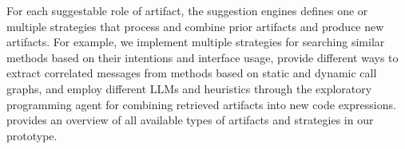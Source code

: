 For each suggestable role of artifact, the suggestion engines defines one or multiple strategies that process and combine prior artifacts and produce new artifacts.
For example, we implement multiple strategies for searching similar methods based on their intentions and interface usage, provide different ways to extract correlated messages from methods based on static and dynamic call graphs, and employ different LLMs and heuristics through the exploratory programming agent for combining retrieved artifacts into new code expressions.
 provides an overview of all available types of artifacts and strategies in our prototype.
